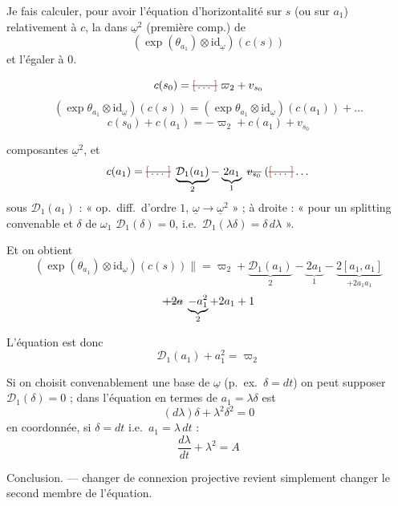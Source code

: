 \documentclass[11pt,a4paper]{article}
\begin{document}
Je fais calculer, pour avoir l'équation d'horizontalité sur $s$ (ou sur $a_1$) relativement à $c$, la   dans $\underline{\omega}^2$ (première comp.) de
\[
(\exp(\theta_{a_1})\otimes\mathrm{id}_{\underline{\omega}})(c(s))
\]
et l'égaler à $0$.

\[
c(s_0)=\text{\struck{\ill{}}}\;\varpi_2+v_{s_0}
\]
\[
(\exp\theta_{a_1}\otimes\mathrm{id}_{\underline{\omega}})(c(s))
=(\exp\theta_{a_1}\otimes\mathrm{id}_{\underline{\omega}})(c(a_1))+\dots
\]
\[
c(s_0)+c(a_1)=-\varpi_2+c(a_1)+v_{s_0}
\]

\ill{} \ill{} composantes \ill{} \ill{} $\underline{\omega}^2$, et \ill{}
\[
c(a_1)=\text{\struck{\ill{}}}\;\underbrace{\mathcal{D}_1(a_1)}_{2}-\underbrace{2a_1}_{1}\;\text{\struck{$v_{s_0}$}}\;(\text{\struck{\ill{}}}\dots
\]
sous $\mathcal{D}_1(a_1)$ : « op.\ diff.\ d'ordre $1$, $\underline{\omega}\to\underline{\omega}^2$ » ; à droite : « pour un splitting convenable et  \struck{\ill{}} $\delta$ de $\omega_1$ \ill{} $\mathcal{D}_1(\delta)=0$, i.e.\ $\mathcal{D}_1(\lambda\delta)=\delta\,d\lambda$ ».

Et on obtient
\[
(\exp(\theta_{a_1})\otimes\mathrm{id}_{\underline{\omega}})(c(s))\|=\varpi_2+\underbrace{\mathcal{D}_1(a_1)}_{2}-\underbrace{2a_1}_{1}-\underbrace{2[a_1,a_1]}_{+2a_1a_1}
\]
\[
\text{\struck{$+2a$}}\;\underbrace{-a_1^2}_{2}+2a_1+1
\]

L'équation est donc
\[
\boxed{\mathcal{D}_1(a_1)+a_1^2=\varpi_2}
\]

Si on choisit convenablement une base de $\underline{\omega}$ (p.\ ex.\ $\delta=dt$) on peut supposer $\mathcal{D}_1(\delta)=0$ ; dans l'équation en termes de $a_1=\lambda\delta$ est
\[
(d\lambda)\delta+\lambda^2\delta^2=0
\]
en coordonnée, si $\delta=dt$ i.e.\ $a_1=\lambda\,dt$ :
\[
\boxed{\frac{d\lambda}{dt}+\lambda^2=A}
\]

Conclusion. — changer de connexion projective revient simplement   changer le second membre de l'équation.
\end{document}
